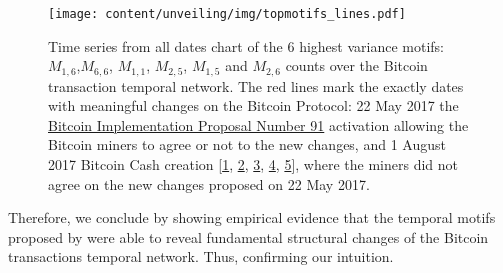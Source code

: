 \documentclass[../../thesis.tex]{subfiles}
\begin{document}
\begin{figure}
\centering
\texttt{[image: content/unveiling/img/topmotifs\_lines.pdf]}
\caption{Time series from all dates chart of the 6 highest variance motifs: $M_{1,6}$,$M_{6,6}$, $M_{1,1}$, $M_{2,5}$, $M_{1,5}$ and $M_{2,6}$ counts over the Bitcoin transaction temporal network. The red lines mark the exactly dates with meaningful changes on the Bitcoin Protocol: 22 May 2017 the \href{https://github.com/bitcoin/bips/blob/master/bip-0091.mediawiki}{Bitcoin Implementation Proposal Number 91} activation allowing the Bitcoin miners to agree or not to the new changes, and 1 August 2017 Bitcoin Cash creation [\href{https://www.cnbc.com/2017/07/31/blockchain-fork-will-create-new-digital-crypto-currency-bitcoin-cash.html}{1}, \href{https://www.theverge.com/2017/8/1/16075276/bitcoin-cash-hard-fork-coinbase}{2}, \href{https://motherboard.vice.com/en_us/article/9kwepa/bitcoin-has-forked}{3}, \href{https://techcrunch.com/2017/08/02/wtf-is-bitcoin-cash-and-is-it-worth-anything/}{4}, \href{http://money.cnn.com/2017/08/01/technology/business/bitcoin-cash-new-currency/index.html}{5}], where the miners did not agree on the new changes proposed on 22 May 2017. }
\label{fig:1h_temporalmotif_by_time_series_all}
\end{figure}

 Therefore, we conclude by showing empirical evidence that the temporal motifs proposed by \cite{temporalMotifs} were able to reveal fundamental structural changes of the Bitcoin transactions temporal network. Thus, confirming our intuition.
\end{document}
